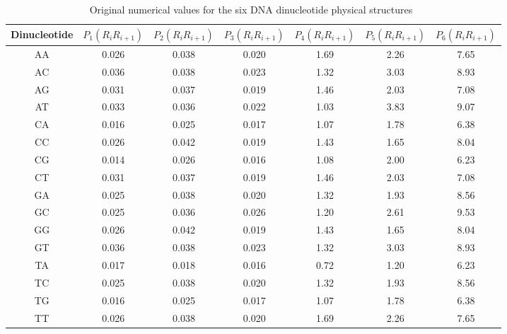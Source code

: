 \begin{table}[ht]

    \caption{Original numerical values for the six DNA dinucleotide physical structures~\cite{Chen2013IRSpot-PseDNC:Composition}}
    \label{tab:original_numerical}
    
    \centering
    \begin{tabular}{ccccccc}

        \toprule
        \textbf{Dinucleotide} & $P_{1}(R_{i}R_{i+1})$ & $P_{2}(R_{i}R_{i+1})$ & $P_{3}(R_{i}R_{i+1})$ & $P_{4}(R_{i}R_{i+1})$ & $P_{5}(R_{i}R_{i+1})$ & $P_{6}(R_{i}R_{i+1})$\\\midrule

        AA & 0.026  & 0.038 & 0.020 & 1.69 & 2.26 & 7.65 \\\midrule
        AC & 0.036  & 0.038 & 0.023 & 1.32 & 3.03 & 8.93 \\\midrule
        AG & 0.031  & 0.037 & 0.019 & 1.46 & 2.03 & 7.08 \\\midrule
        AT & 0.033  & 0.036 & 0.022 & 1.03 & 3.83 & 9.07 \\\midrule
        CA & 0.016  & 0.025 & 0.017 & 1.07 & 1.78 & 6.38 \\\midrule
        CC & 0.026  & 0.042 & 0.019 & 1.43 & 1.65 & 8.04 \\\midrule
        CG & 0.014  & 0.026 & 0.016 & 1.08 & 2.00 & 6.23 \\\midrule
        CT & 0.031  & 0.037 & 0.019 & 1.46 & 2.03 & 7.08 \\\midrule
        GA & 0.025  & 0.038 & 0.020 & 1.32 & 1.93 & 8.56 \\\midrule
        GC & 0.025  & 0.036 & 0.026 & 1.20 & 2.61 & 9.53 \\\midrule
        GG & 0.026  & 0.042 & 0.019 & 1.43 & 1.65 & 8.04 \\\midrule
        GT & 0.036  & 0.038 & 0.023 & 1.32 & 3.03 & 8.93 \\\midrule
        TA & 0.017  & 0.018 & 0.016 & 0.72 & 1.20 & 6.23 \\\midrule
        TC & 0.025  & 0.038 & 0.020 & 1.32 & 1.93 & 8.56 \\\midrule
        TG & 0.016  & 0.025 & 0.017 & 1.07 & 1.78 & 6.38 \\\midrule
        TT & 0.026  & 0.038 & 0.020 & 1.69 & 2.26 & 7.65 \\

        \bottomrule
    \end{tabular}
\end{table}

